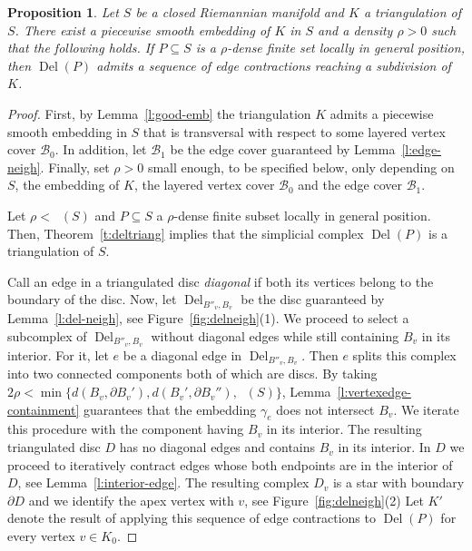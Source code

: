 \documentclass[reqno,english]{amsart}
\newtheorem{proposition}[theorem]{Proposition}
\numberwithin{claimcounter}{theorem}
\theoremstyle{remark}
\theoremstyle{definition}
\numberwithin{theorem}{section}
\DeclareMathOperator{\rscv}{r_{scv}}
\DeclareMathOperator{\rdel}{r_{Del}}
\DeclareMathOperator{\Del}{Del}
\begin{document}
\begin{proposition}
\label{p:refinement}
    Let $S$ be a closed Riemannian manifold and $K$ a triangulation of $S$. There exist a piecewise smooth embedding of $K$ in $S$ and a density $\rho>0$ such that the following holds. If $P\subseteq S$ is a $\rho$-dense finite set locally in general position, then $\Del(P)$ admits a sequence of edge contractions reaching a subdivision of $K$.
\end{proposition}
\begin{proof}
    First, by Lemma~\ref{l:good-emb} the triangulation $K$ admits a piecewise smooth embedding in $S$ that is transversal with respect to some layered vertex cover $\mathcal{B}_0$. In addition, let $\mathcal{B}_1$ be the edge cover guaranteed by Lemma~\ref{l:edge-neigh}.
    Finally, set $\rho >0$ small enough, to be specified below, only depending on $S$, the embedding of $K$, the layered vertex cover $\mathcal{B}_0$ and the edge cover $\mathcal{B}_1$.

    Let $\rho < \rdel(S)$ and $P\subseteq S$ a $\rho$-dense finite subset locally in general position. Then, Theorem~\ref{t:deltriang} implies that the simplicial complex $\Del(P)$ is a triangulation of $S$.

    Call an edge in a triangulated disc \emph{diagonal} if both its vertices belong to the boundary of the disc.
    Now, let $\Del_{B''_v,B_v}$ be the disc guaranteed by Lemma~\ref{l:del-neigh}, see Figure~\ref{fig:delneigh}(1). We proceed to select a subcomplex of $\Del_{B''_v,B_v}$ without diagonal edges while still containing $B_v$ in its interior. For it, let $e$ be a diagonal edge in $\Del_{B''_v,B_v}$. Then $e$ splits this complex into two connected components both of which are 
discs. 
    By taking $2\rho < \min \{d(B_v,\partial B_v'), d(B_v',\partial B_v''), \rscv(S)\}$, Lemma~\ref{l:vertexedge-containment} guarantees that the embedding $\gamma_e$ does not intersect $B_v$. We iterate this procedure with the component having $B_v$ in its interior. The resulting triangulated disc $D$ has no diagonal edges and contains $B_v$ in its interior.
    In $D$ we proceed to iteratively contract edges whose both endpoints are in the interior of $D$, see Lemma~\ref{l:interior-edge}. The resulting complex $D_v$ is a star with boundary $\partial D$ and we identify the apex vertex with $v$, see Figure~\ref{fig:delneigh}(2) Let $K'$ denote the result of applying this sequence of edge contractions to $\Del(P)$ for every vertex $v\in K_0$.
 


\end{proof}
\end{document}
